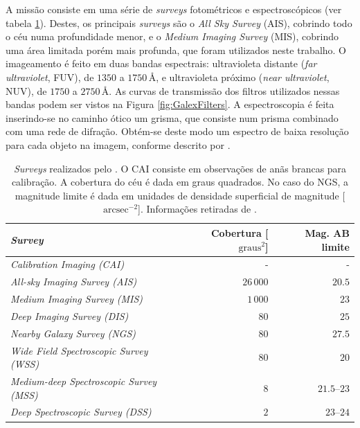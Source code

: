 A missão consiste em uma série de {\em surveys} fotométricos e espectroscópicos
(ver tabela \ref{tab:GalexSurveys}). Destes, os principais {\em surveys} são o
{\em All Sky Survey} (AIS), cobrindo todo o céu numa profundidade menor, e o
{\em Medium Imaging Survey} (MIS), cobrindo uma área limitada porém mais
profunda, que foram utilizados neste trabalho. O imageamento é feito em duas
bandas espectrais: ultravioleta distante ({\em far ultraviolet}, FUV), de $1350$
a $1750\,\text{\AA}$, e ultravioleta próximo ({\em near ultraviolet}, NUV), de
$1750$ a $2750\,\text{\AA}$. As curvas de transmissão dos filtros utilizados
nessas bandas podem ser vistos na Figura \ref{fig:GalexFilters}. A
espectroscopia é feita inserindo-se no caminho ótico um grisma, que consiste num
prisma combinado com uma rede de difração. Obtém-se deste modo um espectro de
baixa resolução para cada objeto na imagem, conforme descrito por
\citet{Morrissey2007}.

\begin{table}
	\caption[{\em Surveys} realizados pelo \galex.]{{\em Surveys} realizados pelo
	\galex. O CAI consiste em observações de anãs brancas para calibração. A
	cobertura do céu é dada em graus quadrados. No caso do NGS, a magnitude limite
	é dada em unidades de densidade superficial de magnitude
	[$\mathrm{arcsec}^{-2}$]. Informações retiradas de \citet{Martin2005}.}
	\begin{tabular}{l r r}
		{\em Survey} & Cobertura [$\mathrm{graus}^2$] & Mag. AB limite \\ 
		\midrule
		{\em Calibration Imaging (CAI)}              &         - &            - \\
		{\em All-sky Imaging Survey (AIS)}           & $26\,000$ &       $20.5$ \\
		{\em Medium Imaging Survey (MIS)}            &  $1\,000$ &         $23$ \\
		{\em Deep Imaging Survey (DIS)}              &      $80$ &         $25$ \\
		{\em Nearby Galaxy Survey (NGS)}             &      $80$ &       $27.5$ \\
		{\em Wide Field Spectroscopic Survey (WSS)}  &      $80$ &         $20$ \\
		{\em Medium-deep Spectroscopic Survey (MSS)} &       $8$ & $21.5$--$23$ \\
		{\em Deep Spectroscopic Survey (DSS)}        &       $2$ &   $23$--$24$ \\
	\end{tabular}
	\label{tab:GalexSurveys}
\end{table}

